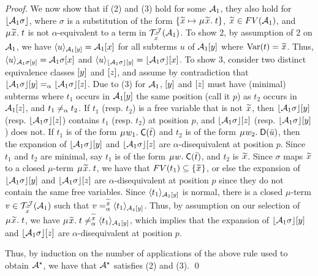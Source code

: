 \begin{rep}
\begin{proof}
We now show that if (2) and (3) hold for some $\Val_1$,
they also hold for $\nf{\Val_1 \sigma}$,
where $\sigma$ is a substitution of the form $\{ {\Varec{x}} \mapsto \MU{\Varec{x}}.\; t \}$,
${\Varec{x}} \in FV( \Val_1 )$,
and $\MU {\Varec{x}}.\; t$ is not $\alpha$-equivalent to a term in $\mathcal{T}^{\smash{\J}}_{\Varec{x}}(\Val_1)$.
To show 2,
by assumption of 2 on $\Val_1$, we have $\interp{\Val_1 \ec{y}}{ u } = \Val_1 \ec{x}$ for
all subterms $u$ of $\Val_1 \ec{y}$ where $\muvar(t) = {\Varec{x}}$.
Thus, $\interp{\Val_1 \sigma \ec{y}}{ u } = \Val_1 \sigma \ec{x}$ and
$\interp{\nf{\Val_1 \sigma} \ec{y}}{ u } = \nf{\Val_1 \sigma} \ec{x}$.
To show 3,
consider two distinct equivalence classes $\ec{y}$ and $\ec{z}$,
and assume by contradiction that $\nf{\Val_1 \sigma} \ec{y} \aequiv \nf{\Val_1 \sigma} \ec{z}$.
Due to (3) for $\Val_1$,
$\ec{y}$ and $\ec{z}$ must have (minimal) subterms
where $t_1$ occurs in $\Val_1 \ec{y}$ the same position (call it $p$) as $t_2$ occurs in $\Val_1 \ec{z}$,
and $t_1 \not\aequiv t_2$.
If $t_1$ (resp. $t_2$) is a free variable that is not ${\Varec{x}}$,
then $\nf{\Val_1 \sigma} \ec{y}$ (resp. $\nf{\Val_1 \sigma} \ec{z}$)
contains $t_1$ (resp. $t_2$) at position $p$,
and $\nf{\Val_1 \sigma} \ec{z}$ (resp. $\nf{\Val_1 \sigma} \ec{y}$) does not.
If $t_1$ is of the form $\MU w_1.\; \const{C}( \vec t )$
and $t_2$ is of the form $\MU w_2.\; \const{D}( \vec u )$,
then the expansion  of $\nf{\Val_1 \sigma} \ec{y}$ and $\nf{\Val_1 \sigma} \ec{z}$
are $\alpha$-disequivalent at position $p$.
Since $t_1$ and $t_2$ are minimal,
say $t_1$ is of the form $\MU w.\; \const{C}( \vec t )$,
and $t_2$ is ${\Varec{x}}$.
Since $\sigma$ maps ${\Varec{x}}$ to a closed $\mu$-term $\MU {\Varec{x}}.\; t$,
we have that $FV( t_1 ) \subseteq \{ {\Varec{x}} \}$,
or else the expansion of $\nf{\Val_1 \sigma} \ec{y}$ and $\nf{\Val_1 \sigma} \ec{z}$
are $\alpha$-disequivalent at position $p$ since they do not contain the same free variables.
Since $\interp{\Val_1 \ec{y}}{t_1}$ is normal,
there is a closed $\mu$-term $v \in \mathcal{T}^{\smash{\J}}_{\Varec{x}}( \Val_1 )$
such that $v \vsimv{\Varec{x}} \interp{\Val_1 \ec{y}}{t_1}$.
Thus, by assumption on our selection of $\MU {\Varec{x}}.\; t$,
we have $\MU {\Varec{x}}.\; t \not\vsimv{\Varec{x}} \interp{\Val_1 \ec{y}}{t_1}$,
which implies that the expansion of $\nf{\Val_1 \sigma} \ec{y}$ and $\nf{\Val_1 \sigma} \ec{z}$
are $\alpha$-disequivalent at position $p$. 

Thus, by induction on the number of applications of the above rule used to obtain $\ValC$,
we have that $\ValC$ satisfies (2) and (3).
\qed
\end{proof}
\end{rep}

